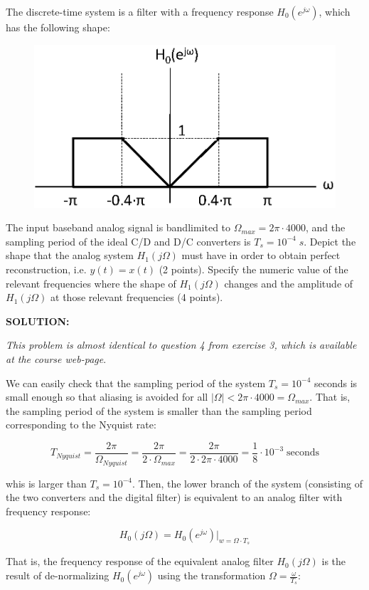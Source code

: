 \documentclass[a4paper,11pt,oneside]{article}
\begin{document}
The discrete-time system is a filter with a frequency response $H_{0}(e^{j\omega})$, which has the following shape:

\begin{figure}[h!]
\centering
\includegraphics[width=.5\textwidth]{fig2.eps}
\label{fig2}
\end{figure} 

The input baseband analog signal is bandlimited to $\Omega_{max}=2\pi\cdot 4000$, and the sampling period of the ideal C/D and D/C converters is $T_s=10^{-4}\; s$. Depict the shape that the analog system $H_{1}(j\Omega)$ must have in order to obtain perfect reconstruction, i.e. $y(t)=x(t)$ (2 points). Specify the numeric value of the relevant frequencies where the shape of $H_{1}(j\Omega)$ changes and the amplitude of $H_{1}(j\Omega)$ at those relevant frequencies (4 points). 


\vspace{1cm}

\textbf{SOLUTION:}

\emph{This problem is almost identical to question 4 from exercise 3, which is available at the course web-page}.

We can easily check that the sampling period of the system $T_s=10^{-4}$ seconds is small enough so that aliasing is avoided for all $|\Omega|<2\pi\cdot 4000=\Omega_{max}$. That is, the sampling period of the system is smaller than the sampling period corresponding to the Nyquist rate:

\[
T_{Nyquist} = \frac{2\pi}{\Omega_{Nyquist}}=\frac{2\pi}{2\cdot\Omega_{max}}=\frac{2\pi}{2\cdot 2\pi \cdot 4000}=\frac{1}{8}\cdot 10^{-3}\;\textrm{seconds}
\]

whis is larger than $T_s=10^{-4}$. Then, the lower branch of the system (consisting of the two converters and the digital filter) is equivalent to an analog filter with frequency response:

\[
H_0(j\Omega)=H_0(e^{j\omega})|_{w=\Omega\cdot T_{s}}
\]

That is, the frequency response of the equivalent analog filter $H_{0}(j\Omega)$ is the result of de-normalizing $H_{0}(e^{j\omega})$ using the transformation $\Omega=\frac{\omega}{T_s}$:
\end{document}
